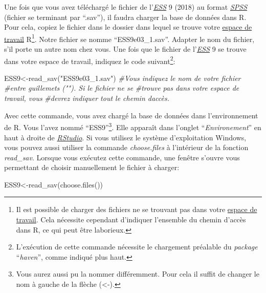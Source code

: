 \documentclass[
]{book}
\newenvironment{Shaded}{\begin{snugshade}}{\end{snugshade}}
\newcommand{\CommentTok}[1]{\textcolor[rgb]{0.56,0.35,0.01}{\textit{#1}}}
\newcommand{\FunctionTok}[1]{\textcolor[rgb]{0.00,0.00,0.00}{#1}}
\newcommand{\NormalTok}[1]{#1}
\newcommand{\OtherTok}[1]{\textcolor[rgb]{0.56,0.35,0.01}{#1}}
\newcommand{\StringTok}[1]{\textcolor[rgb]{0.31,0.60,0.02}{#1}}
\begin{document}
Une fois que vous avez téléchargé le fichier de l'\href{https://www.europeansocialsurvey.org/}{\emph{ESS}} 9 (2018) au format \href{https://www.ibm.com/fr-fr/products/spss-statistics}{\emph{SPSS}} (fichier se terminant par ``.sav''), il faudra charger la base de données dans R. Pour cela, copiez le fichier dans le dossier dans lequel se trouve votre \protect\hyperlink{working_directory}{espace de travail} R\footnote{Il est possible de charger des fichiers ne se trouvant pas dans votre \protect\hyperlink{working_directory}{espace de travail}. Cela nécessite cependant d'indiquer l'ensemble du chemin d'accès dans R, ce qui peut être laborieux.}. Notre fichier se nomme ``ESS9e03\_1.sav''. Adapter le nom du fichier, s'il porte un autre nom chez vous. Une fois que le fichier de l'\href{https://www.europeansocialsurvey.org/}{\emph{ESS}} 9 se trouve dans votre espace de travail, indiquez le code suivant\footnote{L'exécution de cette commande nécessite le chargement préalable du \emph{package} ``\emph{haven}'', comme indiqué plus haut.}:

\begin{Shaded}
\begin{Highlighting}[]
\NormalTok{ESS9}\OtherTok{\textless{}{-}}\FunctionTok{read\_sav}\NormalTok{(}\StringTok{"ESS9e03\_1.sav"}\NormalTok{) }\CommentTok{\#Vous indiquez le nom de votre fichier}
                      \CommentTok{\#entre guillemets (""). Si le fichier ne se}
                      \CommentTok{\#trouve pas dans votre espace de travail, vous}
                      \CommentTok{\#devrez indiquer tout le chemin d\textquotesingle{}accès.}
\end{Highlighting}
\end{Shaded}

Avec cette commande, vous avez chargé la base de données dans l'environnement de R. Vous l'avez nommé ``ESS9''\footnote{Vous aurez aussi pu la nommer différemment. Pour cela il suffit de changer le nom à gauche de la flèche (\textless-).}. Elle apparaît dans l'onglet ``\emph{Environement}'' en haut à droite de \href{https://posit.co/}{\emph{RStudio}}. Si vous utilisez le système d'exploitation Windows, vous pouvez aussi utiliser la commande \emph{choose.files} à l'intérieur de la fonction \emph{read\_sav}. Lorsque vous exécutez cette commande, une fenêtre s'ouvre vous permettant de choisir manuellement le fichier à charger:

\begin{Shaded}
\begin{Highlighting}[]
\NormalTok{ESS9}\OtherTok{\textless{}{-}}\FunctionTok{read\_sav}\NormalTok{(}\FunctionTok{choose.files}\NormalTok{())}
\end{Highlighting}
\end{Shaded}
\end{document}
